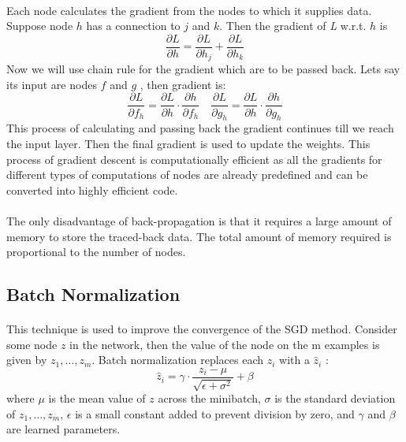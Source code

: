 \documentclass{article}
\begin{document}
  \paragraph{} Each node calculates the gradient from the nodes to which it supplies data. Suppose node $h$ has a connection to $j$ and $k$. Then the gradient of \textit{L} w.r.t. $h$ is 
    \begin{equation*}
      \frac{\partial L}{\partial h} = \frac{\partial L}{\partial h_j} + \frac{\partial L}{\partial h_k}   
    \end{equation*}
    Now we will use chain rule for the gradient which are to be passed back. Lets say its input are nodes $f$ and $g$ , then gradient is:
    \begin{equation*}
      \frac{\partial L}{\partial f_h} = \frac{\partial L}{\partial h} \cdot \frac{\partial h}{\partial f_h} \quad \frac{\partial L}{\partial g_h} = \frac{\partial L}{\partial h} \cdot \frac{\partial h}{\partial g_h}
    \end{equation*}
    This process of calculating and passing back the gradient continues till we reach the input layer. Then the final gradient is used to update the weights. This process of gradient descent is computationally efficient as all the gradients for different types of computations of nodes are already predefined and can be converted into highly efficient code. 
    \paragraph{} The only disadvantage of back-propagation is that it requires a large amount of memory to store the traced-back data. The total amount of memory required is proportional to the number of nodes.

  \subsection{Batch Normalization} 
    \paragraph{} This technique is used to improve the convergence of the SGD method. Consider some node $z$ in the network, then the value of the node on the m examples is given by $z_1, \ldots , z_m$. Batch normalization replaces each $z_i$ with a $\hat{z}_i$ :
    \begin{equation*}
      \hat{z}_i = \gamma \cdot \frac{z_i - \mu}{\sqrt{\epsilon + \sigma^2}} + \beta
    \end{equation*}
    where $\mu$ is the mean value of $z$ across the minibatch, $\sigma$ is the standard deviation of $z_1, \ldots, z_m$, $\epsilon$ is a small constant added to prevent division by zero, and $\gamma$ and $\beta$ are learned parameters.
\end{document}
